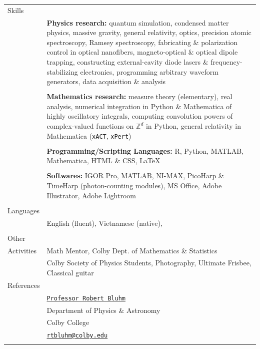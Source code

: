 \documentclass[10pt]{article}
\begin{document}
\begin{longtable}{ l p{14.5cm}   }
  
  
  						 
  						 
  \large{Skills}      	& \\ 
  						& \textbf{Physics research:} quantum simulation, condensed matter physics, massive gravity,  general relativity, optics, precision atomic spectroscopy, Ramsey spectroscopy, fabricating \& polarization control in optical nanofibers, magneto-optical \& optical dipole trapping, constructing external-cavity diode lasers \& frequency-stabilizing electronics, programming arbitrary waveform generators, data acquisition \& analysis \\
  						& \\
  						& \textbf{Mathematics research:} measure theory (elementary), real analysis, numerical integration in Python \& Mathematica of highly oscillatory integrals, computing convolution powers of complex-valued functions on $\mathbb{Z}^d$ in Python, general relativity in Mathematica (\texttt{xACT}, \texttt{xPert})  \\
  						& \\
  						& \textbf{Programming/Scripting Languages:} R, Python, MATLAB, Mathematica, HTML \& CSS, \LaTeX{}\\
  						& \\
  						& \textbf{Softwares:} IGOR Pro, MATLAB, NI-MAX, PicoHarp \& TimeHarp (photon-counting modules), MS Office,  Adobe Illustrator, Adobe Lightroom\\ 
  						& \\
  						 
  				

  \large{Languages}     & \\
  						& English (fluent), Vietnamese (native), \\
						& \\
  						 
  \large{Other}         & \\ 
  \large{Activities}	& Math Mentor, Colby Dept. of Mathematics \& Statistics \\
  						& Colby Society of Physics Students, Photography, Ultimate Frisbee, Classical guitar \\
  						
  						
  						


     		

  \large{References}	& \\
  						& \href{http://www.colby.edu/physics/faculty/robert.html}{\texttt{Professor Robert Bluhm}} \\
  						& Department of Physics \& Astronomy \\
  						& Colby College \\
  						& {\href{mailto:rtbluhm@colby.edu}{\texttt{rtbluhm@colby.edu}}} \\
  						&  \\
  						

\end{longtable}
\end{document}
